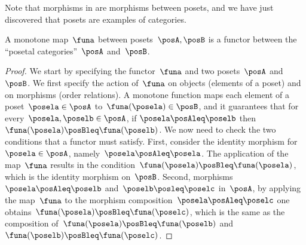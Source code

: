 Note that morphisms in \Pos are morphisms between posets, and we have just discovered that posets are examples of categories.
\begin{lemma}
  \label{lem:posetfunctor}
  A monotone map~$\funa$ between posets~$\posA,\posB$ is a functor between the ``posetal categories''~$\posA$ and~$\posB$.  
\end{lemma}
\begin{proof}
  We start by specifying the functor~$\funa$ and two posets~$\posA$ and~$\posB$. We first specify the action of~$\funa$ on objects (elements of a poset) and on morphisms (order relations). A monotone function maps each element of a poset~$\posela\in \posA$ to~$\funa(\posela) \in \posB$, and it guarantees that for every~$\posela,\poselb\in \posA$, if $\posela\posAleq \poselb$ then~$\funa(\posela)\posBleq \funa(\poselb)$. We now need to check the two conditions that a functor must satisfy. First, consider the identity morphism for~$\posela\in \posA$, namely~$\posela \posAleq \posela$. The application of the map~$\funa$ results in the condition~$\funa(\posela)\posBleq \funa(\posela)$, which is the identity morphism on~$\posB$. Second, morphisms~$\posela\posAleq \poselb$ and~$\poselb\posleq \poselc$ in~$\posA$, by applying the map~$\funa$ to the morphism composition~$\posela\posAleq \poselc$ one obtains~$\funa(\posela)\posBleq \funa(\poselc)$, which is the same as the composition of~$\funa(\posela)\posBleq \funa(\poselb)$ and~$\funa(\poselb)\posBleq \funa(\poselc)$.
\end{proof}

\devel{} %
